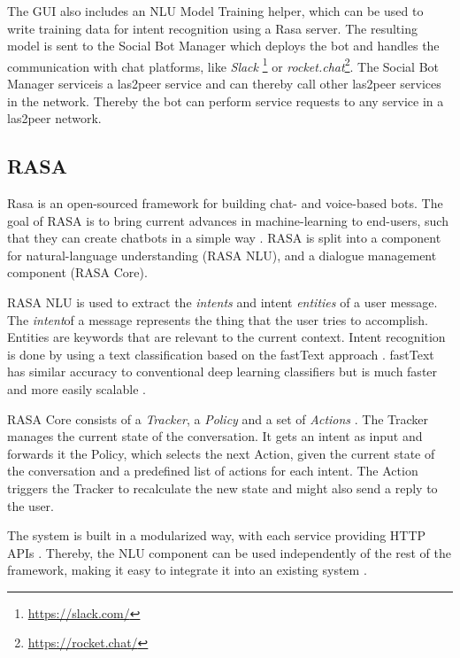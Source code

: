 The GUI also includes an NLU Model Training helper, which can be used to write training data for intent recognition using a Rasa server.
The resulting model is sent to the Social Bot Manager which deploys the bot and handles the communication with chat platforms, like \emph{Slack} \footnote{\url{https://slack.com/}} or \emph{rocket.chat}\footnote{\url{https://rocket.chat/}}. 
The Social Bot Manager service\footnotemark is a las2peer service and can thereby call other las2peer services in the network. 
Thereby the bot can perform service requests to any service in a las2peer network.

\subsection{RASA}
Rasa is an open-sourced framework for building chat- and voice-based bots. The goal of RASA is to bring current advances in machine-learning to end-users, such that they can create chatbots in a simple way \cite{BFPN17}. 
RASA is split into a component for natural-language understanding (RASA NLU), and a dialogue management component (RASA Core).

RASA NLU is used to extract the \emph{intents} and intent \emph{entities} of a user message.
The \emph{intent}\footnotemark of a message represents the thing that the user tries to accomplish. 
Entities are keywords that are relevant to the current context.
Intent recognition is done by using a text classification based on the fastText approach \cite{BFPN17}. 
fastText has similar accuracy to conventional deep learning classifiers but is much faster and more easily scalable \cite{JGBM16}.

RASA Core consists of a \emph{Tracker}, a \emph{Policy} and a set of \emph{Actions} \cite{BFPN17}. The Tracker manages the current state of the conversation. It gets an intent as input and forwards it the Policy, which selects the next Action, given the current state of the conversation and a predefined list of actions for each intent. The Action triggers the Tracker to recalculate the new state and might also send a reply to the user.

The system is built in a modularized way, with each service providing HTTP APIs \cite{BFPN17}. Thereby, the NLU component can be used independently of the rest of the framework, making it easy to integrate it into an existing system \cite{RaKe19}.


